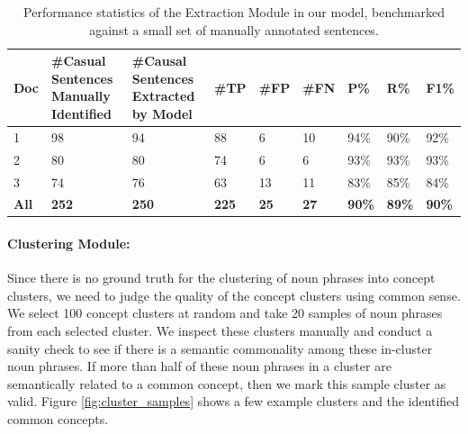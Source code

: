 \begin{table} 
\small
\centering
\begin{tabular} {| m{2em} | m{5em} |m{5em} | m{3em} |m{3em} | m{3em} |m{3em} | m{3em} | m{3em} |}


\hline
 Doc & \#Casual Sentences Manually Identified & \#Causal Sentences Extracted by Model & \#TP & \#FP & \#FN & P\% & R\% & F1\%\\ 
\hline
\hline
1	& 98	& 94	& 88	& 6	& 10	& 94\%	 &90\%	 &92\% \\
\hline
2	&80    &	80	&74	&6	&6	&93\%	&93\%	&93\% \\
\hline
3	&74	&76	&63	&13	&11	&83\%	&85\%	&84\%\\
\hline
\textbf{All}	&\textbf{252}	&\textbf{250}	&\textbf{225}	&\textbf{25}	&\textbf{27}	&\textbf{90\%}	&\textbf{89\%}	&\textbf{90\%}\\
\hline
\hline
\end{tabular}
\caption{Performance statistics of the Extraction Module in our model, benchmarked against a small set of manually annotated sentences.}
\label{table:eval}
\end{table}



\paragraph{Clustering Module:} Since there is no ground truth for the clustering of noun phrases into concept clusters, we need to judge the quality of the concept clusters using common sense. We select 100 concept clusters at random and take 20 samples of noun phrases from each selected cluster. We inspect these clusters manually and conduct a sanity check to see if there is a semantic commonality among these in-cluster noun phrases. If more than half of these noun phrases in a cluster are semantically related to a common concept, then we mark this sample cluster as valid. Figure \ref{fig:cluster_samples} shows a few example clusters and the identified common concepts.

